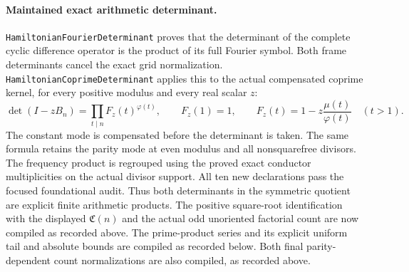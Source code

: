 \paragraph{Maintained exact arithmetic determinant.}
\texttt{HamiltonianFourierDeterminant} proves that the determinant
of the complete cyclic difference operator is the product of its
full Fourier symbol. Both frame determinants cancel the exact
grid normalization.
\texttt{HamiltonianCoprimeDeterminant} applies this to the
actual compensated coprime kernel, for every positive modulus
and every real scalar \(z\):
\[
 \det(I-zB_n)
   =\prod_{t\mid n}F_z(t)^{\varphi(t)},\qquad
 F_z(1)=1,\qquad
 F_z(t)=1-z\frac{\mu(t)}{\varphi(t)}\quad(t>1).
\]
The constant mode is compensated before the determinant is taken.
The same formula retains the parity mode at even modulus and all
nonsquarefree divisors. The frequency product is regrouped using
the proved exact conductor multiplicities on the actual divisor
support. All ten new declarations pass the focused foundational
audit. Thus both determinants in the symmetric quotient are
explicit finite arithmetic products. The positive square-root
identification with the displayed \(\mathfrak C(n)\) and the
actual odd unoriented factorial count are now compiled as
recorded above. The prime-product series and its explicit
uniform tail and absolute bounds are compiled as recorded
below. Both final parity-dependent count normalizations are
also compiled, as recorded above.



